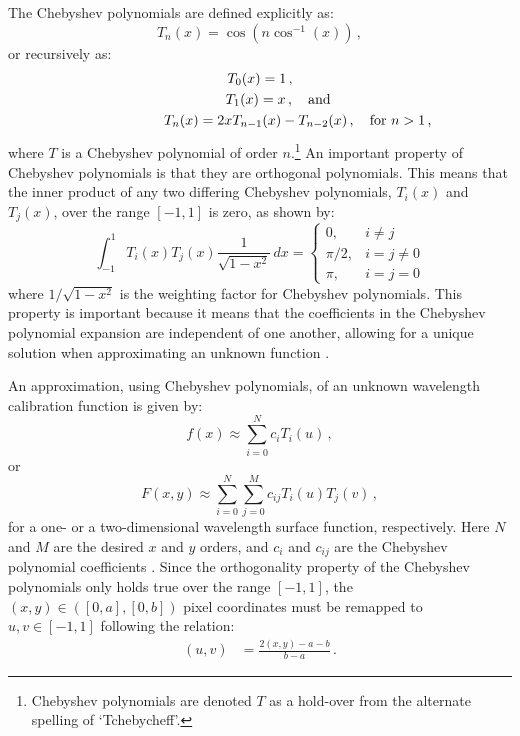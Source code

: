 The Chebyshev polynomials are defined explicitly as:
\begin{equation}
    T_{n}(x) = \cos(n \cos^{-1}(x))\,,\label{eq:chebypolyexplicit}
\end{equation}
or recursively as:
\begin{equation}
    \begin{gathered}
        T_{0}(x) = 1\,,\\
        T_{1}(x) = x\,,\rlap{\quad and}\\
        T_{n}(x) = 2 x T_{n - 1}(x) - T_{n - 2}(x)\,,\rlap{\quad for $n > 1$\,,}
    \end{gathered}\label{eq:chebypoly}
\end{equation}
where $T$ is a Chebyshev polynomial of order $n$.\footnote{Chebyshev polynomials are denoted $T$ as a hold-over from the alternate spelling of `Tchebycheff'.}
An important property of Chebyshev polynomials is that they are orthogonal polynomials. This means that the inner product of any two differing Chebyshev polynomials, $T_{i}(x)$ and $T_{j}(x)$, over the range $[-1, 1]$ is zero, as shown by:
\begin{equation}
    \int_{-1}^{1} T_{i}(x) T_{j}(x) \frac{1}{\sqrt{1-x^{2}}} \,dx =
    \begin{cases}
        0,       & i \neq j     \\
        \pi / 2, & i = j \neq 0 \\
        \pi,     & i = j = 0
    \end{cases}\label{eq:chebyorth}
\end{equation}
where $1 / \sqrt{1 - x^{2}}$ is the weighting factor for Chebyshev polynomials. This property is important because it means that the coefficients in the Chebyshev polynomial expansion are independent of one another, allowing for a unique solution when approximating an unknown function \citep{numerical_recipes, cheby}.

An approximation, using Chebyshev polynomials, of an unknown wavelength calibration function is given by:
\begin{equation}
    f(x) \approx \sum_{i = 0}^{N}  c_{i} T_{i}(u)\,,\label{eq:chebyshev}
\end{equation}
or
\begin{equation}
    F(x, y) \approx \sum_{i = 0}^{N} \sum_{j = 0}^{M} c_{ij} T_{i}(u) T_{j}(v)\,,\label{eq:chebyshev2D}
\end{equation}
for a one- or a two-dimensional wavelength surface function, respectively. Here $N$ and $M$ are the desired $x$ and $y$ orders, and $c_{i}$ and $c_{ij}$ are the Chebyshev polynomial coefficients \citep{chebysurf, cheby2d}. Since the orthogonality property of the Chebyshev polynomials only holds true over the range $[-1, 1]$, the $(x, y) \in ([0, a], [0, b])$ pixel coordinates must be remapped to $u, v \in [-1, 1]$ following the relation:
\begin{align}
    (u, v) & = \frac{2 (x, y) - a - b}{b - a}\,.\label{eq:XtoUV}
\end{align}


